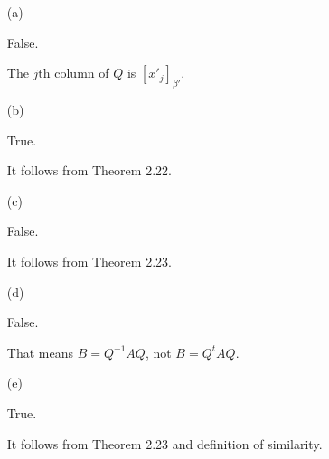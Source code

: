 \begin{Exercise}
\begin{enumerate}[(a)]
\item[(a)]
\begin{answer}
False.
\end{answer}
\begin{solution}
The $j$th column of $Q$ is $[x'_j]_{\beta'}$.
\end{solution}

\item[(b)]
\begin{answer}
True.
\end{answer}
\begin{solution}
It follows from Theorem 2.22.
\end{solution}

\item[(c)]
\begin{answer}
False.
\end{answer}
\begin{solution}
It follows from Theorem 2.23.
\end{solution}

\item[(d)]
\begin{answer}
False.
\end{answer}
\begin{solution}
That means $B = Q^{-1} A Q$, not $B = Q^t A Q$.
\end{solution}

\item[(e)]
\begin{answer}
True.
\end{answer}
\begin{solution}
It follows from Theorem 2.23 and definition of similarity.
\end{solution}

\end{enumerate}
\end{Exercise}
